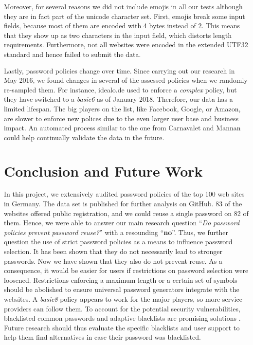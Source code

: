 Moreover, for several reasons we did not include emojis in all our tests although they are in fact part of the unicode character set. First, emojis break some input fields, because most of them are encoded with 4 bytes instead of 2. This means that they show up as two characters in the input field, which distorts length requirements. Furthermore, not all websites were encoded in the extended UTF32 standard and hence failed to submit the data. 

Lastly, password policies change over time. Since carrying out our research in May 2016, we found changes in several of the assessed policies when we randomly re-sampled them. For instance, idealo.de used to enforce a \textit{complex} policy, but they have switched to a \textit{basic6} as of January 2018. Therefore, our data has a limited lifespan. The big players on the list, like Facebook, Google, or Amazon, are slower to enforce new polices due to the even larger user base and business impact. An automated process similar to the one from Carnavalet and Mannan \cite{Carnavalet2014AnalyzingPWStrengthMeters} could help continually validate the data in the future. 

\section{Conclusion and Future Work}
In this project, we extensively audited password policies of the top 100 web sites in Germany. The data set is published for further analysis on GitHub. 83 of the websites offered public registration, and we could reuse a single password on 82 of them. Hence, we were able to answer our main research question ``\textit{Do password policies prevent password reuse?}'' with a resounding ``\textbf{no}''. Thus, we further question the use of strict password policies as a means to influence password selection. It has been shown that they do not necessarily lead to stronger passwords. Now we have shown that they also do not prevent reuse. As a consequence, it would be easier for users if restrictions on password selection were loosened. Restrictions enforcing a maximum length or a certain set of symbols should be abolished to ensure universal password generators integrate with the websites. A \textit{basic8} policy appears to work for the major players, so more service providers can follow them. To account for the potential security vulnerabilities, blacklisted common passwords and adaptive blacklists are promising solutions \cite{Habib2017Blacklists, Segreti2017AdaptivePolicies}.  Future research should thus evaluate the specific blacklists and user support to help them find alternatives in case their password was blacklisted. 

